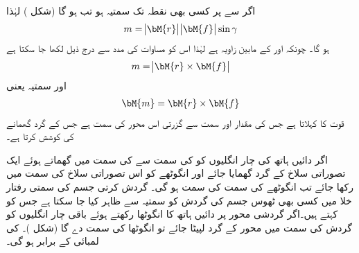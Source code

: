 اگر  سے  پر کسی بھی نقطہ  تک سمتیہ  ہو تب  ہو گا (شکل ) لہٰذا 
\begin{align*}
m=\abs{\bM{r}}\abs{\bM{f}}\sin \gamma
\end{align*}
ہو گا۔ چونکہ  اور  کے مابین زاویہ  ہے لہٰذا اس کو مساوات  کی مدد سے  درج ذیل لکھا جا سکتا ہے
\begin{align*}
m=\abs{\bM{r}\times \bM{f}}
\end{align*}
اور سمتیہ  یعنی
\begin{align}
\bM{m}=\bM{r}\times \bM{f}
\end{align}
قوت  کا  کہلاتا ہے جس کی مقدار    اور  سمت  سے گزرتی اس محور کی سمت ہے جس کے گرد    گھمانے کی کوشش کرتا ہے۔

اگر دائیں ہاتھ کی چار انگلیوں کو  کی سمت سے  کی سمت میں گھماتے ہوئے ایک  تصوراتی سلاخ کے گرد  گھمایا جائے اور انگوٹھے  کو اس تصوراتی سلاخ کی سمت میں رکھا جائے تب انگوٹھے کی سمت  کی سمت ہو گی۔ 
\quad گردش کرتی جسم کی سمتی رفتار\\
خلا میں کسی بھی ٹھوس جسم  کی گردش کو سمتیہ  سے ظاہر کیا جا سکتا ہے جس کو  کہتے ہیں۔اگر گردشی محور پر دائیں ہاتھ کا انگوٹھا رکھتے ہوئے باقی چار انگلیوں کو گردش کی سمت میں محور کے گرد لپیٹا جائے تو انگوٹھا  کی سمت دے گا  (شکل )۔ کی لمبائی   کے برابر ہو گی۔

